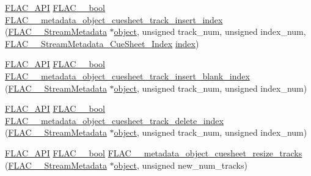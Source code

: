 \begin{DoxyCompactItemize}
\mbox{\hyperlink{group__flac__export_ga56ca07df8a23310707732b1c0007d6f5}{F\+L\+A\+C\+\_\+\+A\+PI}} \mbox{\hyperlink{ordinals_8h_a95103469f1cbd78b8cf250194985b34e}{F\+L\+A\+C\+\_\+\+\_\+bool}} \mbox{\hyperlink{group__flac__metadata__object_ga2f8c5d80c409eff5ebd53ccd0c6f0984}{F\+L\+A\+C\+\_\+\+\_\+metadata\+\_\+object\+\_\+cuesheet\+\_\+track\+\_\+insert\+\_\+index}} (\mbox{\hyperlink{struct_f_l_a_c_____stream_metadata}{F\+L\+A\+C\+\_\+\+\_\+\+Stream\+Metadata}} $\ast$\mbox{\hyperlink{_s_d_l__opengl__glext_8h_ab49790263c78300fbf05719e38246198}{object}}, unsigned track\+\_\+num, unsigned index\+\_\+num, \mbox{\hyperlink{struct_f_l_a_c_____stream_metadata___cue_sheet___index}{F\+L\+A\+C\+\_\+\+\_\+\+Stream\+Metadata\+\_\+\+Cue\+Sheet\+\_\+\+Index}} \mbox{\hyperlink{_s_d_l__opengl__glext_8h_a57f14e05b1900f16a2da82ade47d0c6d}{index}})
\item 
\mbox{\hyperlink{group__flac__export_ga56ca07df8a23310707732b1c0007d6f5}{F\+L\+A\+C\+\_\+\+A\+PI}} \mbox{\hyperlink{ordinals_8h_a95103469f1cbd78b8cf250194985b34e}{F\+L\+A\+C\+\_\+\+\_\+bool}} \mbox{\hyperlink{group__flac__metadata__object_gaa1401ea99e4dc61d3eb034aed7d99602}{F\+L\+A\+C\+\_\+\+\_\+metadata\+\_\+object\+\_\+cuesheet\+\_\+track\+\_\+insert\+\_\+blank\+\_\+index}} (\mbox{\hyperlink{struct_f_l_a_c_____stream_metadata}{F\+L\+A\+C\+\_\+\+\_\+\+Stream\+Metadata}} $\ast$\mbox{\hyperlink{_s_d_l__opengl__glext_8h_ab49790263c78300fbf05719e38246198}{object}}, unsigned track\+\_\+num, unsigned index\+\_\+num)
\item 
\mbox{\hyperlink{group__flac__export_ga56ca07df8a23310707732b1c0007d6f5}{F\+L\+A\+C\+\_\+\+A\+PI}} \mbox{\hyperlink{ordinals_8h_a95103469f1cbd78b8cf250194985b34e}{F\+L\+A\+C\+\_\+\+\_\+bool}} \mbox{\hyperlink{group__flac__metadata__object_ga9cba3429dcc863714ceb1de6952c4737}{F\+L\+A\+C\+\_\+\+\_\+metadata\+\_\+object\+\_\+cuesheet\+\_\+track\+\_\+delete\+\_\+index}} (\mbox{\hyperlink{struct_f_l_a_c_____stream_metadata}{F\+L\+A\+C\+\_\+\+\_\+\+Stream\+Metadata}} $\ast$\mbox{\hyperlink{_s_d_l__opengl__glext_8h_ab49790263c78300fbf05719e38246198}{object}}, unsigned track\+\_\+num, unsigned index\+\_\+num)
\item 
\mbox{\hyperlink{group__flac__export_ga56ca07df8a23310707732b1c0007d6f5}{F\+L\+A\+C\+\_\+\+A\+PI}} \mbox{\hyperlink{ordinals_8h_a95103469f1cbd78b8cf250194985b34e}{F\+L\+A\+C\+\_\+\+\_\+bool}} \mbox{\hyperlink{group__flac__metadata__object_gafb0e09fdcfb08c466ceb1f6bca961177}{F\+L\+A\+C\+\_\+\+\_\+metadata\+\_\+object\+\_\+cuesheet\+\_\+resize\+\_\+tracks}} (\mbox{\hyperlink{struct_f_l_a_c_____stream_metadata}{F\+L\+A\+C\+\_\+\+\_\+\+Stream\+Metadata}} $\ast$\mbox{\hyperlink{_s_d_l__opengl__glext_8h_ab49790263c78300fbf05719e38246198}{object}}, unsigned new\+\_\+num\+\_\+tracks)

\end{DoxyCompactItemize}
